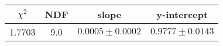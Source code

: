 \begin{tabular}{|c|c|c|c|}

\hline
$\chi^{2}$ & NDF & slope & y-intercept  \\
\hline
1.7703 & 9.0 & $0.0005\pm0.0002$ & $0.9777\pm0.0143$ \\
\hline

\end{tabular}